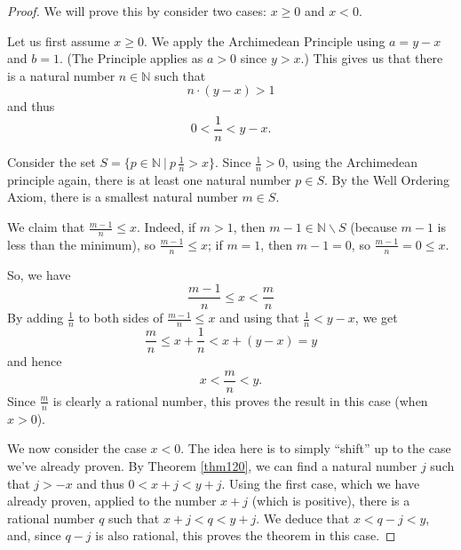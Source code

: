 \documentclass[12pt]{amsart}
\newcommand{\N}{\mathbb{N}}
\numberwithin{equation}{section}
\theoremstyle{plain} %
\theoremstyle{definition}
\theoremstyle{remark}
\begin{document}
\begin{proof} We will prove this by consider two cases: $x \geq 0$ and $x < 0$.

Let us first assume $x \geq 0$.
We apply the Archimedean Principle using $a = y-x$ and $b = 1$. (The Principle applies as
$a > 0$ since $y> x$.) This gives us that there is a natural number $n \in \N$ such that
$$
n \cdot (y-x) > 1
$$
and thus
$$
0 < \frac{1}{n} < y-x.
$$

Consider the set $S=\{p\in \N \ | \ p \, \frac{1}{n} >x \}$.
Since $\frac{1}{n} > 0$, using the Archimedean principle again, there is at least one natural number $p\in S$. By the Well Ordering Axiom, there is a smallest natural number $m\in S$. 

We claim that $\frac{m-1}{n} \leq x$. Indeed, if $m>1$, then $m-1\in \N \smallsetminus S$ (because $m-1$ is less than the minimum), so $\frac{m-1}{n}\leq x$; if $m=1$, then $m-1=0$, so $\frac{m-1}{n} = 0 \leq x$.

So, we have
$$
\frac{m-1}{n} \leq x< \frac{m}{n}
$$
By adding $\frac{1}{n}$ to both sides of $\frac{m-1}{n} \leq x$ and using that $\frac{1}{n} < y- x$, we get
$$
\frac{m}{n} \leq x + \frac{1}{n} < x + (y -x) = y
$$
and hence
$$
x < \frac{m}{n} < y.
$$
Since $\frac{m}{n}$ is clearly a rational number, this proves the result in this case (when $x > 0$). 

We now consider the case $x < 0$. The idea here is to simply ``shift'' up to the case we've already proven. 
By Theorem \ref{thm120}, we can find a natural number $j$ such that $j > -x$ and thus $0 < x +j < y +j$. Using the first case, which we have already proven,
applied 
to the number $x + j$ (which is positive), there is a rational number $q$ such that $x+j < q < y+j$. We deduce that $x < q-j < y$, and, since $q - j$ is also
rational, this proves the theorem in this case.
\end{proof}

\newpage
\end{document}
